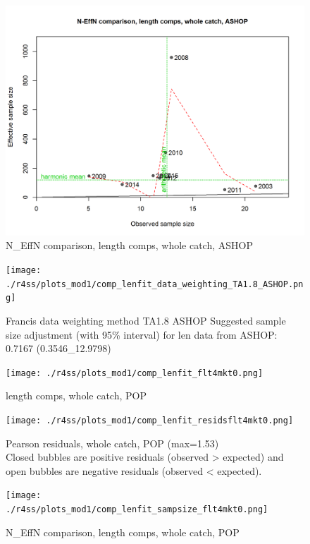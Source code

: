 \documentclass[12pt,]{article}
\begin{document}
\begin{figure}
\centering
\includegraphics{./r4ss/plots_mod1/comp_lenfit_sampsize_flt2mkt0.png}
\caption{N\_EffN comparison, length comps, whole catch, ASHOP
\label{fig:mod1_12_comp_lenfit_sampsize_flt2mkt0}}
\end{figure}

\begin{figure}
\centering
\texttt{[image: ./r4ss/plots\_mod1/comp\_lenfit\_data\_weighting\_TA1.8\_ASHOP.png]}
\caption{Francis data weighting method TA1.8 ASHOP Suggested sample size
adjustment (with 95\% interval) for len data from ASHOP: 0.7167
(0.3546\_12.9798)
\label{fig:mod1_13_comp_lenfit_data_weighting_TA1.8_ASHOP}}
\end{figure}

\begin{figure}
\centering
\texttt{[image: ./r4ss/plots\_mod1/comp\_lenfit\_flt4mkt0.png]}
\caption{length comps, whole catch, POP
\label{fig:mod1_14_comp_lenfit_flt4mkt0}}
\end{figure}

\begin{figure}
\centering
\texttt{[image: ./r4ss/plots\_mod1/comp\_lenfit\_residsflt4mkt0.png]}
\caption{Pearson residuals, whole catch, POP (max=1.53)\\
Closed bubbles are positive residuals (observed \textgreater{} expected)
and open bubbles are negative residuals (observed \textless{} expected).
\label{fig:mod1_15_comp_lenfit_residsflt4mkt0}}
\end{figure}

\begin{figure}
\centering
\texttt{[image: ./r4ss/plots\_mod1/comp\_lenfit\_sampsize\_flt4mkt0.png]}
\caption{N\_EffN comparison, length comps, whole catch, POP
\label{fig:mod1_16_comp_lenfit_sampsize_flt4mkt0}}
\end{figure}
\end{document}
